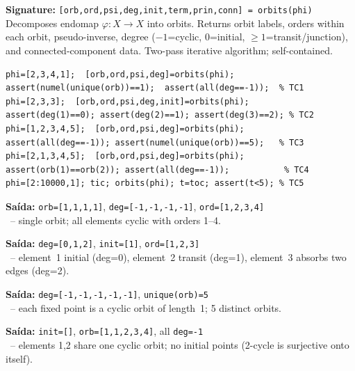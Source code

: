 \chapter{}
\begin{tcolorbox}[Abox,title={Analysis}]
\textbf{Signature:} \lstinline|[orb,ord,psi,deg,init,term,prin,conn] = orbits(phi)|\\
Decomposes endomap $\varphi:X\!\to\!X$ into orbits. Returns orbit labels, orders within each orbit, pseudo-inverse, degree ($-1$=cyclic, $0$=initial, $\geq1$=transit/junction), and connected-component data. Two-pass iterative algorithm; self-contained.
\end{tcolorbox}
\begin{lstlisting}[caption={Tests for orbits.m}]
phi=[2,3,4,1];  [orb,ord,psi,deg]=orbits(phi);
assert(numel(unique(orb))==1);  assert(all(deg==-1));  % TC1
phi=[2,3,3];  [orb,ord,psi,deg,init]=orbits(phi);
assert(deg(1)==0); assert(deg(2)==1); assert(deg(3)==2); % TC2
phi=[1,2,3,4,5];  [orb,ord,psi,deg]=orbits(phi);
assert(all(deg==-1)); assert(numel(unique(orb))==5);   % TC3
phi=[2,1,3,4,5];  [orb,ord,psi,deg]=orbits(phi);
assert(orb(1)==orb(2)); assert(all(deg==-1));           % TC4
phi=[2:10000,1]; tic; orbits(phi); t=toc; assert(t<5); % TC5
\end{lstlisting}
\begin{tcolorbox}[Pbox,title={TC1 -- Pure 4-cycle \texttt{[2,3,4,1}]}]
\textbf{Saída:} \texttt{orb=[1,1,1,1]}, \texttt{deg=[-1,-1,-1,-1]}, \texttt{ord=[1,2,3,4]}\\
\APROVADO\ -- single orbit; all elements cyclic with orders 1--4.
\end{tcolorbox}
\begin{tcolorbox}[Pbox,title={TC2 -- Chain \texttt{[2,3,3}]}]
\textbf{Saída:} \texttt{deg=[0,1,2]}, \texttt{init=[1]}, \texttt{ord=[1,2,3]}\\
\APROVADO\ -- element~1 initial (deg=0), element~2 transit (deg=1), element~3 absorbs two edges (deg=2).
\end{tcolorbox}
\begin{tcolorbox}[Pbox,title={TC3 -- Identity \texttt{[1,2,3,4,5}]}]
\textbf{Saída:} \texttt{deg=[-1,-1,-1,-1,-1]}, \texttt{unique(orb)=5}\\
\APROVADO\ -- each fixed point is a cyclic orbit of length~1; 5 distinct orbits.
\end{tcolorbox}
\begin{tcolorbox}[Pbox,title={TC4 -- 2-cycle + fixed points \texttt{[2,1,3,4,5}]}]
\textbf{Saída:} \texttt{init=[]}, \texttt{orb=[1,1,2,3,4]}, all \texttt{deg=-1}\\
\APROVADO\ -- elements 1,2 share one cyclic orbit; no initial points (2-cycle is surjective onto itself).
\end{tcolorbox}
